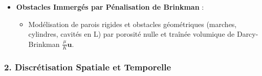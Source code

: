 \documentclass[
  french,
]{article}
\providecommand{\tightlist}{%
  \setlength{\itemsep}{0pt}\setlength{\parskip}{0pt}}
\begin{document}
\begin{itemize}
  \begin{itemize}
  \tightlist
  \item
    Équation d'advection-diffusion scalaire pour le champ de température
    \(T\).
  \item
    Couplage thermo-convectif par l'\textbf{approximation de Boussinesq}
    \(\mathbf{f}_b = -\rho \beta (T - T_0) \mathbf{g}\).
  \end{itemize}
\item
  \textbf{Obstacles Immergés par Pénalisation de Brinkman} :

  \begin{itemize}
  \tightlist
  \item
    Modélisation de parois rigides et obstacles géométriques (marches,
    cylindres, cavités en L) par porosité nulle et traînée volumique de
    Darcy-Brinkman \(\frac{\mu}{K} \mathbf{u}\).
  \end{itemize}
\end{itemize}

\subsubsection{2. Discrétisation Spatiale et
Temporelle}\label{discruxe9tisation-spatiale-et-temporelle}
\end{document}
